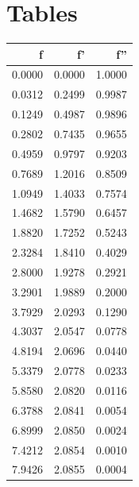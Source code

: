 \documentclass[a4paper,11pt]{article}
\begin{document}
\section{Tables}
\begin{table}[H]
\begin{subtable}{.5\linewidth}
\begin{adjustbox}{height =9cm ,center}        
\centering                   
\begin{tabular}{|r|r|r|}     
\hline
f  &f'&f''\\
\hline                       
0.0000 & 0.0000 & 1.0000 \\  
\hline                       
0.0312 & 0.2499 & 0.9987 \\  
\hline                       
0.1249 & 0.4987 & 0.9896 \\  
\hline                       
0.2802 & 0.7435 & 0.9655 \\  
\hline                       
0.4959 & 0.9797 & 0.9203 \\  
\hline                       
0.7689 & 1.2016 & 0.8509 \\  
\hline                       
1.0949 & 1.4033 & 0.7574 \\  
\hline                       
1.4682 & 1.5790 & 0.6457 \\  
\hline                       
1.8820 & 1.7252 & 0.5243 \\  
\hline                       
2.3284 & 1.8410 & 0.4029 \\  
\hline                       
2.8000 & 1.9278 & 0.2921 \\  
\hline                       
3.2901 & 1.9889 & 0.2000 \\  
\hline                       
3.7929 & 2.0293 & 0.1290 \\  
\hline                       
4.3037 & 2.0547 & 0.0778 \\  
\hline                       
4.8194 & 2.0696 & 0.0440 \\  
\hline                       
5.3379 & 2.0778 & 0.0233 \\  
\hline                       
5.8580 & 2.0820 & 0.0116 \\  
\hline                       
6.3788 & 2.0841 & 0.0054 \\  
\hline                       
6.8999 & 2.0850 & 0.0024 \\  
\hline                       
7.4212 & 2.0854 & 0.0010 \\  
\hline                       
7.9426 & 2.0855 & 0.0004 \\  

\end{tabular}
\end{adjustbox}
\end{subtable}
\end{table}
\end{document}
